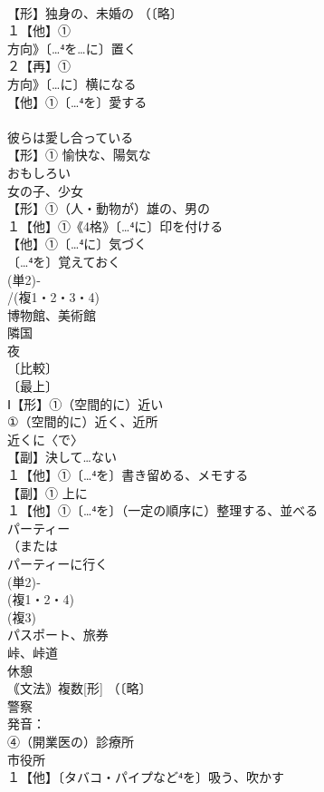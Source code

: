 \documentclass[8pt]{extreport}
\begin{document}
\begin{CJK}{UTF8}{min}
\\	【形】独身の、未婚の （〔略〕
\\	１【他】①
\\	方向》〔…⁴を…に〕置く 
\\	２【再】①
\\	方向》〔…に〕横になる
\\	【他】①〔…⁴を〕愛する 
\\	[相互的に(4格)] 
\\	彼らは愛し合っている 
\\	【形】① 愉快な、陽気な 
\\	おもしろい
\\	女の子、少女 
\\	【形】①（人・動物が）雄の、男の 
\\	１【他】①《4格》〔…⁴に〕印を付ける 
\\	【他】①〔…⁴に〕気づく 
\\	〔…⁴を〕覚えておく 
\\	(単2)‐
\\	/(複1・2・3・4)
\\	博物館、美術館 
\\	隣国 
\\	夜 
\\	〔比較〕
\\	〔最上〕
\\	Ⅰ【形】①（空間的に）近い 
\\	①（空間的に）近く、近所 
\\	近くに〈で〉
\\	【副】決して…ない 
\\	１【他】①〔…⁴を〕書き留める、メモする 
\\	【副】① 上に 
\\	１【他】①〔…⁴を〕（一定の順序に）整理する、並べる
\\	パーティー 
\\	（または
\\	パーティーに行く
\\	(単2)‐
\\	(複1・2・4)
\\	(複3)
\\	パスポート、旅券 
\\	峠、峠道
\\	休憩 
\\	｟文法｠複数[形] （〔略〕
\\	警察 
\\	発音：
\\	④（開業医の）診療所
\\	市役所 
\\	１【他】〔タバコ・パイプなど⁴を〕吸う、吹かす 

\end{CJK}
\end{document}
